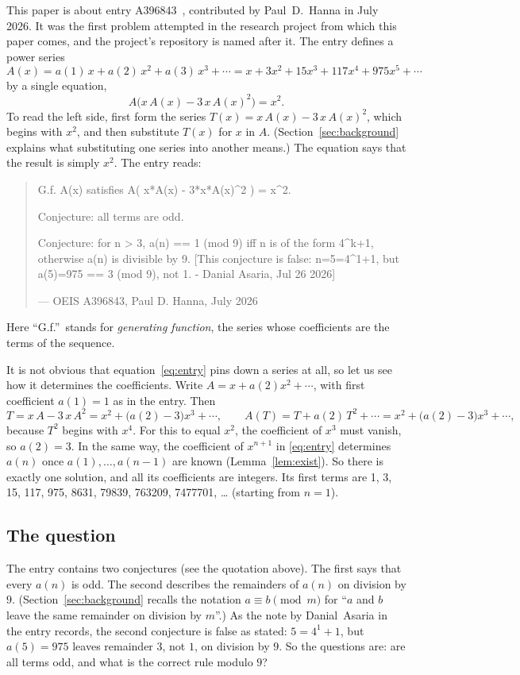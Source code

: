 \documentclass[11pt,a4paper]{article}
\theoremstyle{definition}
\theoremstyle{remark}
\begin{document}
This paper is about entry A396843~\cite{oeis3}, contributed by Paul~D.~Hanna in July 2026.
It was the first problem attempted in the research project from which this paper comes, and the
project's repository is named after it.
The entry defines a power series
\[
A(x)=a(1)\,x+a(2)\,x^2+a(3)\,x^3+\cdots=x+3x^2+15x^3+117x^4+975x^5+\cdots
\]
by a single equation,
\begin{equation}\label{eq:entry}
A\bigl(x\,A(x)-3\,x\,A(x)^2\bigr)=x^2 .
\end{equation}
To read the left side, first form the series $T(x)=x\,A(x)-3\,x\,A(x)^2$, which begins with $x^2$, and
then substitute $T(x)$ for $x$ in $A$. (Section~\ref{sec:background} explains what substituting one series into another
means.) The equation says that the result is simply $x^2$. The entry reads:
\begin{quote}\small\ttfamily\raggedright G.f. A(x) satisfies A( x*A(x) - 3*x*A(x)\^{}2 ) = x\^{}2.\par\smallskip Conjecture: all terms are odd.\par\smallskip Conjecture: for n > 3, a(n) == 1 (mod 9) iff n is of the form 4\^{}k+1, otherwise a(n) is divisible by 9. [This conjecture is false: n=5=4\^{}1+1, but a(5)=975 == 3 (mod 9), not 1. - Danial Asaria, Jul 26 2026]\par\smallskip\hfill\textrm{--- OEIS A396843, Paul D. Hanna, July 2026}\end{quote}

Here ``G.f.''\ stands for \emph{generating function}, the series whose coefficients are the terms of the sequence.

It is not obvious that equation~\eqref{eq:entry} pins down a series at all, so let us see how it determines the
coefficients. Write $A=x+a(2)x^2+\cdots$, with first coefficient $a(1)=1$ as in the entry. Then
\[
T=x\,A-3\,x\,A^2=x^2+\bigl(a(2)-3\bigr)x^3+\cdots,
\qquad
A(T)=T+a(2)\,T^2+\cdots=x^2+\bigl(a(2)-3\bigr)x^3+\cdots,
\]
because $T^2$ begins with $x^4$. For this to equal $x^2$, the coefficient of $x^3$ must vanish, so
$a(2)=3$. In the same way, the coefficient of $x^{n+1}$ in \eqref{eq:entry} determines $a(n)$ once
$a(1),\dots,a(n-1)$ are known (Lemma~\ref{lem:exist}). So there is exactly one solution, and all its coefficients are
integers. Its first terms are 1, 3, 15, 117, 975, 8631, 79839, 763209, 7477701, \dots{} (starting from $n=1$).

\subsection{The question}
The entry contains two conjectures (see the quotation above). The first says that every $a(n)$ is odd. The
second describes the remainders of $a(n)$ on division by $9$. (Section~\ref{sec:background} recalls the notation
$a\equiv b\pmod m$ for ``$a$ and $b$ leave the same remainder on division by $m$''.) As the note by Danial~Asaria in the
entry records, the second conjecture is false as stated: $5=4^1+1$, but $a(5)=975$ leaves remainder $3$, not $1$, on
division by $9$. So the questions are: are all terms odd, and what is the correct rule modulo $9$?
\end{document}
